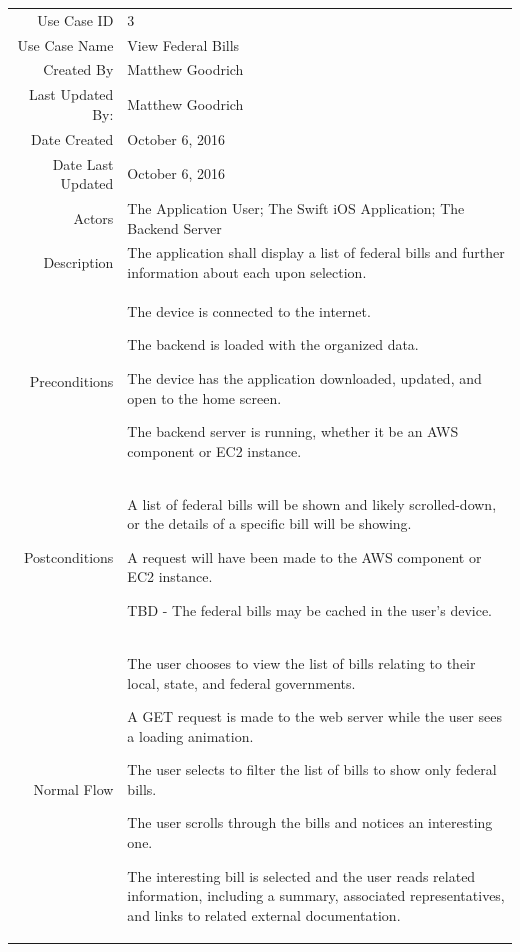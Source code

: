 \documentclass[12pt,oneside,letterpaper]{article}
\newenvironment{packed_enumerate}{
\begin{minipage}[t]{\linewidth}\begin{compactenum}[after=\strut]}
{\end{compactenum}\end{minipage}}
\begin{document}
\begin{longtable}{|r|p{3.8in}|}
\hline
Use Case ID&3\\
Use Case Name&View Federal Bills\\
Created By&Matthew Goodrich\\
Last Updated By:&Matthew Goodrich\\
Date Created&October 6, 2016\\
Date Last Updated&October 6, 2016\\
Actors&The Application User; The Swift iOS Application; The Backend Server\\
Description&The application shall display a list of federal bills and further information about each upon selection.\\
Preconditions&
\begin{packed_enumerate}
\item The device is connected to the internet.
\item The backend is loaded with the organized data.
\item The device has the application downloaded, updated, and open to the home screen.
\item The backend server is running, whether it be an AWS component or EC2 instance.
\end{packed_enumerate}\\
Postconditions&
\begin{packed_enumerate}
\item A list of federal bills will be shown and likely scrolled-down, or the details of a specific bill will be showing.
\item A request will have been made to the AWS component or EC2 instance.
\item TBD - The federal bills may be cached in the user's device.
\end{packed_enumerate}\\
Normal Flow&
\begin{packed_enumerate}
\item The user chooses to view the list of bills relating to their local, state, and federal governments.
\item A GET request is made to the web server while the user sees a loading animation.
\item The user selects to filter the list of bills to show only federal bills.
\item The user scrolls through the bills and notices an interesting one.
\item The interesting bill is selected and the user reads related information, including a summary, associated representatives, and links to related external documentation.

\end{packed_enumerate}
\end{longtable}
\end{document}
